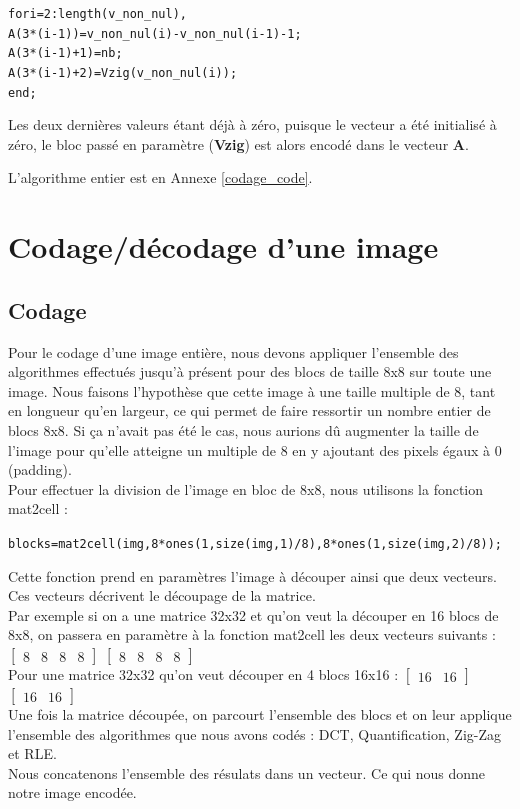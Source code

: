 \documentclass[a4paper, 12pt]{article}
\begin{document}
\begin{alltt}
for i=2:length(v_non_nul),
    A(3*(i-1)) = v_non_nul(i) - v_non_nul(i-1) - 1;
    A(3*(i-1)+1) = nb;
    A(3*(i-1)+2) = Vzig(v_non_nul(i));
end;
\end{alltt}

Les deux dernières valeurs étant déjà à zéro, puisque le vecteur a été initialisé à zéro, le bloc passé en paramètre (\textbf{Vzig}) est alors encodé dans le vecteur \textbf{A}.

L'algorithme entier est en Annexe \ref{codage_code}.

\section{Codage/décodage d'une image}
\subsection{Codage}
Pour le codage d'une image entière, nous devons appliquer l'ensemble des algorithmes effectués jusqu'à présent pour des blocs de taille 8x8 sur toute une image. Nous faisons l'hypothèse que cette image à une taille multiple de 8, tant en longueur qu'en largeur, ce qui permet de faire ressortir un nombre entier de blocs 8x8. Si ça n'avait pas été le cas, nous aurions dû augmenter la taille de l'image pour qu'elle atteigne un multiple de 8 en y ajoutant des pixels égaux à 0 (padding).\\
Pour effectuer la division de l'image en bloc de 8x8, nous utilisons la fonction mat2cell : 
\begin{alltt}
blocks = mat2cell(img,8*ones(1,size(img,1)/8),8*ones(1,size(img,2)/8));
\end{alltt}

Cette fonction prend en paramètres l'image à découper ainsi que deux vecteurs. Ces vecteurs décrivent le découpage de la matrice. \\
Par exemple si on a une matrice 32x32 et qu'on veut la découper en 16 blocs de 8x8, on passera en paramètre à la fonction mat2cell les deux vecteurs suivants : \\
$\begin{bmatrix}
   8 & 8 & 8 & 8
\end{bmatrix}$
$\begin{bmatrix}
   8 & 8 & 8 & 8
\end{bmatrix}$ \\
Pour une matrice 32x32 qu'on veut découper en 4 blocs 16x16 :
$\begin{bmatrix}
   16 & 16
\end{bmatrix}$
$\begin{bmatrix}
   16 & 16
\end{bmatrix}$ \\
Une fois la matrice découpée, on parcourt l'ensemble des blocs et on leur applique l'ensemble des algorithmes que nous avons codés : DCT, Quantification, Zig-Zag et RLE.\\
Nous concatenons l'ensemble des résulats dans un vecteur. Ce qui nous donne notre image encodée.
\end{document}
